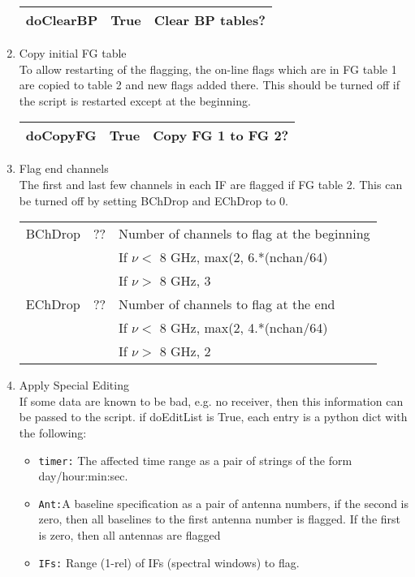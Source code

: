 \documentclass[11pt]{article}
\begin{document}
\begin{enumerate}
\begin{center}
\begin{tabular}{|l|c|l|}
doClearBP    & True & Clear BP tables? \\
\hline
\end{tabular}
\end{center}
%
\item Copy initial FG table \\
To allow restarting of the flagging, the on-line flags which are in FG
table 1 are copied to table 2 and new flags added there.
This should be turned off if the script is restarted except at the beginning.
\begin{center}
\begin{tabular}{|l|c|l|}
\hline
doCopyFG  & True & Copy FG 1 to FG 2? \\
\hline
\end{tabular}
\end{center}
%
\item Flag end channels\\
The first and last few channels in each IF are flagged if FG table 2.
This can be turned off by setting BChDrop and EChDrop to 0.
\begin{center}
\begin{tabular}{|l|c|l|}
\hline
BChDrop  & ?? & Number of channels to flag at the beginning \\
 & & If $\nu<$ 8 GHz, max(2, 6.*(nchan/64)\\
 & & If $\nu>$ 8 GHz, 3\\
EChDrop  & ?? & Number of channels to flag at the end \\
 & & If $\nu<$ 8 GHz, max(2, 4.*(nchan/64)\\
 & & If $\nu>$ 8 GHz, 2\\
\hline
\end{tabular}
\end{center}
%
%
\item Apply Special Editing\\
If some data are known to be bad, e.g. no receiver, then this
information can be passed to the script.
if doEditList is True, each entry is a python dict with the following:
\begin{itemize}
\item{\tt timer:} The affected time range as a pair of strings of the
form day/hour:min:sec.
\item{\tt Ant:}A baseline specification as a pair of antenna numbers,
if the second is zero, then all baselines to the first antenna number
is flagged.  
If the first is zero, then all antennas are flagged
\item{\tt IFs:} Range (1-rel)  of IFs (spectral windows) to flag.

\end{itemize}
\end{enumerate}
\end{document}
